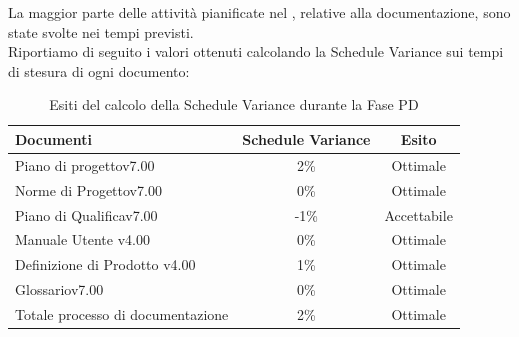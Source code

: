 			La maggior parte delle attività pianificate nel , relative alla documentazione, sono state svolte nei tempi previsti. \\
			Riportiamo di seguito i valori ottenuti calcolando la Schedule Variance sui tempi di stesura di ogni documento:
			\begin{table}[H]
					\centering
					\begin{tabu}{| l | c | c |}
							\hline
							Documenti 							& Schedule Variance	& Esito		\\ \hline \hline						
							Piano di progettov7.00				& 2\% 		& Ottimale  \\ \hline
							Norme di Progettov7.00 			& 0\%		& Ottimale  \\ \hline
							Piano di Qualificav7.00 			& -1\%		& Accettabile  \\ \hline
							Manuale Utente v4.00 				& 0\%		& Ottimale  \\ \hline
							Definizione di Prodotto v4.00 		& 1\%		& Ottimale  \\ \hline
							Glossariov7.00					 	& 0\% 		& Ottimale \\ \hline
							Totale processo di documentazione 	& 2\% 		& Ottimale \\ \hline
					\end{tabu}
				\caption{Esiti del calcolo della Schedule Variance durante la Fase PD}
			\end{table}
							
